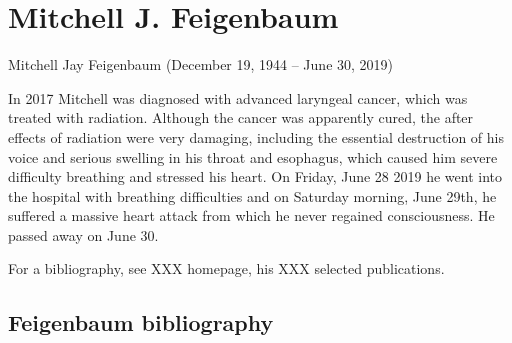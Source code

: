 
\chapter{Mitchell J. Feigenbaum}
\label{c-Feigenbaum}

Mitchell Jay Feigenbaum (December 19, 1944 -- June 30, 2019)
\bigskip

In 2017 Mitchell was diagnosed with advanced laryngeal cancer, which was
treated with radiation. Although the cancer was apparently cured, the
after effects of radiation were very damaging, including the essential
destruction of his voice and serious swelling in his throat and
esophagus, which caused him severe difficulty breathing and stressed his
heart. On Friday, June 28 2019 he went into the hospital with breathing
difficulties and on Saturday morning, June 29th, he suffered a massive
heart attack from which he never regained consciousness. He passed away
on June 30.

For a bibliography, see
{XXX} homepage,
his
{XXX selected publications}.

\section{Feigenbaum bibliography}
\label{sect:Feigenbaum}

